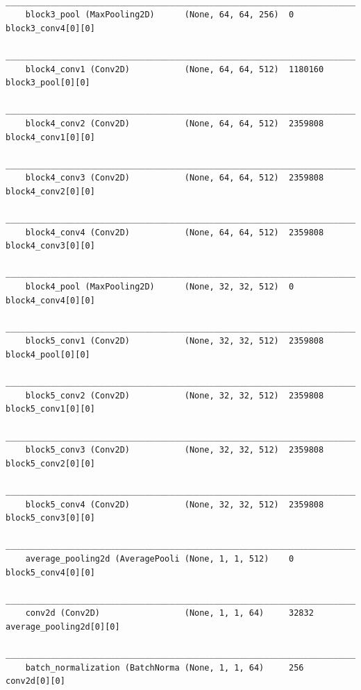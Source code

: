 {\begin{verbatim}
    __________________________________________________________________________________________________
    block3_pool (MaxPooling2D)      (None, 64, 64, 256)  0           block3_conv4[0][0]               
    __________________________________________________________________________________________________
    block4_conv1 (Conv2D)           (None, 64, 64, 512)  1180160     block3_pool[0][0]                
    __________________________________________________________________________________________________
    block4_conv2 (Conv2D)           (None, 64, 64, 512)  2359808     block4_conv1[0][0]               
    __________________________________________________________________________________________________
    block4_conv3 (Conv2D)           (None, 64, 64, 512)  2359808     block4_conv2[0][0]               
    __________________________________________________________________________________________________
    block4_conv4 (Conv2D)           (None, 64, 64, 512)  2359808     block4_conv3[0][0]               
    __________________________________________________________________________________________________
    block4_pool (MaxPooling2D)      (None, 32, 32, 512)  0           block4_conv4[0][0]               
    __________________________________________________________________________________________________
    block5_conv1 (Conv2D)           (None, 32, 32, 512)  2359808     block4_pool[0][0]                
    __________________________________________________________________________________________________
    block5_conv2 (Conv2D)           (None, 32, 32, 512)  2359808     block5_conv1[0][0]               
    __________________________________________________________________________________________________
    block5_conv3 (Conv2D)           (None, 32, 32, 512)  2359808     block5_conv2[0][0]               
    __________________________________________________________________________________________________
    block5_conv4 (Conv2D)           (None, 32, 32, 512)  2359808     block5_conv3[0][0]               
    __________________________________________________________________________________________________
    average_pooling2d (AveragePooli (None, 1, 1, 512)    0           block5_conv4[0][0]               
    __________________________________________________________________________________________________
    conv2d (Conv2D)                 (None, 1, 1, 64)     32832       average_pooling2d[0][0]          
    __________________________________________________________________________________________________
    batch_normalization (BatchNorma (None, 1, 1, 64)     256         conv2d[0][0]                     

\end{verbatim}}
